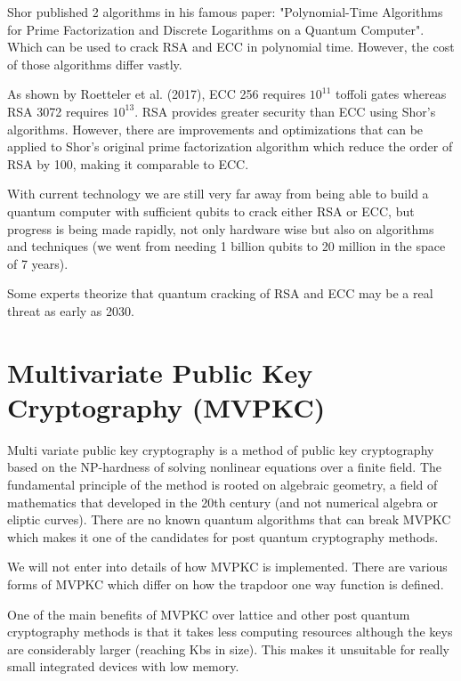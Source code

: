 Shor published 2 algorithms in his famous paper: "Polynomial-Time Algorithms for
Prime Factorization and Discrete Logarithms on a Quantum Computer". Which can be
used to crack RSA and ECC in polynomial time. However, the cost of those
algorithms differ vastly.

As shown by Roetteler et al. (2017), ECC 256 requires $10^{11}$  toffoli gates
whereas RSA 3072 requires $10^{13}$. RSA provides greater security than ECC
using Shor's algorithms. However, there are improvements and optimizations that
can be applied to Shor's original prime factorization algorithm which reduce the
order of RSA by 100, making it comparable to ECC.

With current technology we are still very far away from being able to build a
quantum computer with sufficient qubits to crack either RSA or ECC, but progress
is being made rapidly, not only hardware wise but also on algorithms and
techniques (we went from needing 1 billion qubits to 20 million in the space of 7 years).

Some experts theorize that quantum cracking of RSA and ECC may be a real threat
as early as 2030.


\section{Multivariate Public Key Cryptography (MVPKC)}

Multi variate public key cryptography is a method of public key cryptography
based on the NP-hardness of solving nonlinear equations over a finite field.
The fundamental principle of the method is rooted on algebraic geometry, a field
of mathematics that developed in the 20th century (and not numerical algebra or
eliptic curves). There are no known quantum algorithms that can break MVPKC
which makes it one of the candidates for post quantum cryptography methods.

We will not enter into details of how MVPKC is implemented.  There are various
forms of MVPKC which differ on how the trapdoor one way function is defined.

One of the main benefits of MVPKC over lattice and other post quantum
cryptography methods is that it takes less computing resources although the keys
are considerably larger (reaching Kbs in size). This makes it unsuitable for
really small integrated devices with low memory.




